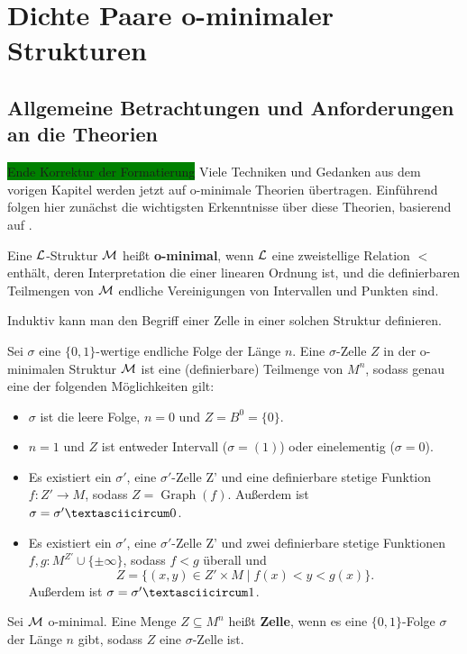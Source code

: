 \chapter{Dichte Paare o-minimaler Strukturen}
\section{Allgemeine Betrachtungen und Anforderungen an die Theorien}
\colorbox{green}{Ende Korrektur der Formatierung}
Viele Techniken und Gedanken aus dem vorigen Kapitel werden jetzt auf o-minimale Theorien übertragen. Einführend folgen hier zunächst die wichtigsten Erkenntnisse über diese Theorien, basierend auf \cite{vdDZellzerlegung}.

\begin{definition}
	Eine $\mathcal{L}$-Struktur $\mathcal{M}$ heißt \textbf{o-minimal}, wenn $\mathcal{L}$ eine zweistellige Relation $<$ enthält, deren Interpretation die einer linearen Ordnung ist, und die definierbaren Teilmengen von $\mathcal{M}$ endliche Vereinigungen von Intervallen und Punkten sind.
\end{definition}

Induktiv kann man den Begriff einer Zelle in einer solchen Struktur definieren.
\begin{definition}
	Sei $\sigma$ eine $\{0,1\}$-wertige endliche Folge der Länge $n$. Eine $\sigma$-Zelle $Z$ in der o-minimalen Struktur $\mathcal{M}$ ist eine (definierbare) Teilmenge von $M^n$, sodass genau eine der folgenden Möglichkeiten gilt:
	\begin{itemize}
		\item $\sigma$ ist die leere Folge, $n=0$ und $Z=B^0=\{0\}$.
		\item $n=1$ und $Z$ ist entweder Intervall ($\sigma=(1)$) oder einelementig ($\sigma=0$).
		\item Es existiert ein $\sigma'$, eine $\sigma'$-Zelle Z' und eine definierbare stetige Funktion $f:Z'\rightarrow M$, sodass $Z=\operatorname{Graph}(f)$. Außerdem ist $\sigma=\sigma'\textasciicircum0$.
		\item Es existiert ein $\sigma'$, eine $\sigma'$-Zelle Z' und zwei definierbare stetige Funktionen $f,g:M^{Z'}\cup\{\pm\infty\}$, sodass $f<g$ überall und $$Z=\{(x,y)\in Z'\times M\mid f(x)<y<g(x)\}.$$ Außerdem ist $\sigma=\sigma'\textasciicircum1$.
	\end{itemize}
\end{definition}
\begin{definition}
	Sei $\mathcal{M}$ o-minimal. Eine Menge $Z\subseteq M^n$ heißt \textbf{Zelle}, wenn es eine $\{0,1\}$-Folge $\sigma$ der Länge $n$ gibt, sodass $Z$ eine $\sigma$-Zelle ist.
\end{definition}


